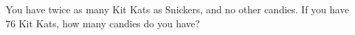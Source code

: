 You have twice as many Kit Kats as Snickers, and no other candies. If you have $76$ Kit Kats, how many candies do you have?
